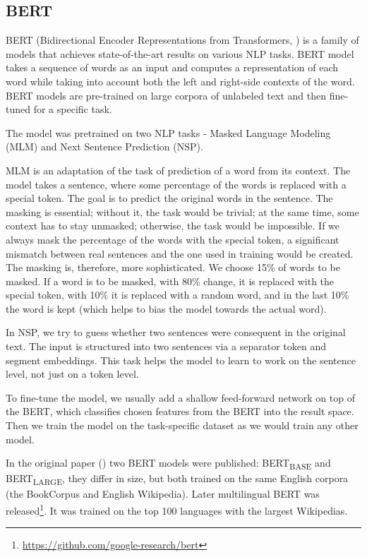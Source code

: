 \subsection{BERT}
\label{sec:bert}
BERT (Bidirectional Encoder Representations from Transformers, \cite{bert}) is a family of models that achieves state-of-the-art results on various NLP tasks. BERT model takes a sequence of words as an input and computes a representation of each word while taking into account both the left and right-side contexts of the word. BERT models are pre-trained on large corpora of unlabeled text and then fine-tuned for a specific task. 

The model was pretrained on two NLP tasks - Masked Language Modeling (MLM) and Next Sentence Prediction (NSP). 

MLM is an adaptation of the task of prediction of a word from its context. The model takes a sentence, where some percentage of the words is replaced with a special token. The goal is to predict the original words in the sentence. The masking is essential; without it, the task would be trivial; at the same time, some context has to stay unmasked; otherwise, the task would be impossible. If we always mask the percentage of the words with the special token, a significant mismatch between real sentences and the one used in training would be created. The masking is, therefore, more sophisticated. We choose 15\% of words to be masked. If a word is to be masked, with 80\% change, it is replaced with the special token, with 10\% it is replaced with a random word, and in the last 10\% the word is kept (which helps to bias the model towards the actual word).

In NSP, we try to guess whether two sentences were consequent in the original text. The input is structured into two sentences via a separator token and segment embeddings. This task helps the model to learn to work on the sentence level, not just on a token level.

To fine-tune the model, we usually add a shallow feed-forward network on top of the BERT, which classifies chosen features from the BERT into the result space. Then we train the model on the task-specific dataset as we would train any other model.

In the original paper (\cite{bert}) two BERT models were published: BERT\textsubscript{BASE} and BERT\textsubscript{LARGE}, they differ in size, but both trained on the same English corpora (the BookCorpus and English Wikipedia). Later multilingual BERT was released\footnote{\url{https://github.com/google-research/bert}}. It was trained on the top 100 languages with the largest Wikipedias.


